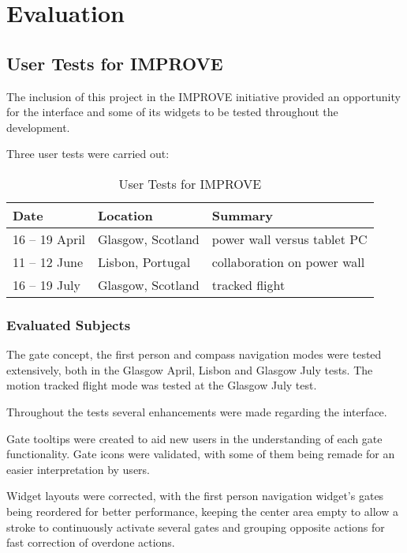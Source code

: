 \chapter{Evaluation}



\section{User Tests for IMPROVE}

The inclusion of this project in the IMPROVE initiative provided an opportunity
for the interface and some of its widgets to be tested throughout the development.

Three user tests were carried out:

\begin{table}[ht]
		\centering
				\begin{tabular}{|l|l|l|}
						\hline
						Date						& Location					& Summary \\
						\hline
						16 -- 19 April	& Glasgow, Scotland	& power wall versus tablet PC \\
						11 -- 12 June		& Lisbon, Portugal	& collaboration on power wall \\
						16 -- 19 July		& Glasgow, Scotland	& tracked flight \\ %
						\hline
				\end{tabular}
		\caption{User Tests for IMPROVE}
		\label{tab:user-tests}
\end{table}

\subsection{Evaluated Subjects}

The gate concept, the first person and compass navigation modes were tested extensively,
both in the Glasgow April, Lisbon and Glasgow July tests.
The motion tracked flight mode was tested at the Glasgow July test.

Throughout the tests several enhancements were made regarding the interface.

Gate tooltips were created to aid new users in the understanding of each gate functionality.
Gate icons were validated, with some of them being remade for an easier interpretation by users.

Widget layouts were corrected, with the first person navigation widget's gates being reordered
for better performance, keeping the center area empty to allow a stroke to continuously activate
several gates and grouping opposite actions for fast correction of overdone actions.

